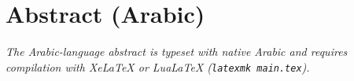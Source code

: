 
\ifPDFTeX
\chapter*{Abstract (Arabic)}
\noindent\textit{The Arabic-language abstract is typeset with native Arabic and
requires compilation with XeLaTeX or LuaLaTeX (\texttt{latexmk main.tex}).}
\else
{}
